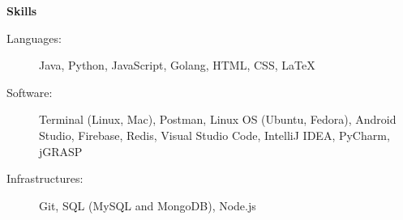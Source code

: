\documentclass[letterpaper,11pt]{article}
\makeatletter
\newcommand{\resitem}[1]{\item #1 \vspace{-2pt}}
\newcommand{\resheading}[1]{{\large \colorbox{mygrey}{\begin{minipage}{\textwidth}{\textbf{#1 \vphantom{p\^{E}}}}\end{minipage}}}}
\newcommand{\ressubheading}[4]{
\begin{tabular*}{7.0in}{l@{\extracolsep{\fill}}r}
		\textbf{#1} & #2 \\
		\textit{#3} & \textit{#4} \\
\end{tabular*}\vspace{-6pt}}
\makeatother
\begin{document}

\resheading{Skills}

\begin{description}
\item[Languages:] Java, Python, JavaScript, Golang, HTML, CSS, LaTeX %
\item[Software:] Terminal (Linux, Mac), Postman, Linux OS (Ubuntu, Fedora), Android Studio, Firebase, Redis, Visual Studio Code, IntelliJ IDEA, PyCharm, jGRASP
\item[Infrastructures:] Git, SQL (MySQL and MongoDB), Node.js
\end{description}
\end{document}
